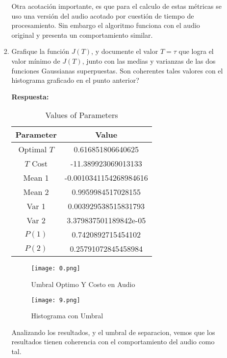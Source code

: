 \documentclass[spanish]{article}
\begin{document}
\begin{enumerate}
\begin{enumerate}
\begin{enumerate}
\par Otra acotación importante, es que para el calculo de estas métricas se uso una versión del audio acotado por cuestión de tiempo de procesamiento. Sin embargo el algoritmo funciona con el audio original y presenta un comportamiento similar.



\item Grafique la función $J(T)$, y documente el valor $T=\tau$ que logra
el valor mínimo de $J(T)$, junto con las medias y varianzas de las
dos funciones Gaussianas superpuestas. Son coherentes tales valores
con el histograma graficado en el punto anterior?
\vspace{5px}

\par \textbf{Respuesta:}

\begin{table}[htbp]
\centering
\begin{tabular}{|c|c|}
\hline
\textbf{Parameter} & \textbf{Value} \\
\hline
Optimal $T$ & 0.616851806640625 \\
$T$ Cost & -11.389923069013133 \\
Mean 1 & -0.0010341154268984616 \\
Mean 2 & 0.9959984517028155 \\
Var 1 & 0.003929538515831793 \\
Var 2 & 3.379837501189842e-05 \\
$P(1)$ & 0.7420892715454102 \\
$P(2)$ & 0.25791072845458984 \\
\hline
\end{tabular}
\caption{Values of Parameters}
\label{tab:parameters}
\end{table}

\begin{figure}[h]
    \centering
    \texttt{[image: 0.png]}
    \caption{Umbral Optimo Y Costo en Audio}
    \label{fig:enter-label}
\end{figure}

\begin{figure}[h]
    \centering
    \texttt{[image: 9.png]}
    \caption{Histograma con Umbral}
    \label{fig:enter-label}
\end{figure}

\par Analizando los resultados, y el umbral de separacion, vemos que los resultados tienen coherencia con el comportamiento del audio como tal.
\vspace{5px}


\end{enumerate}
\end{enumerate}
\end{enumerate}
\end{document}
